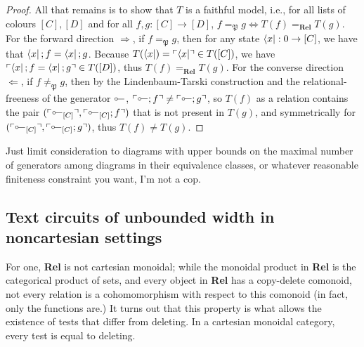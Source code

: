 \begin{theorem}
\begin{proof}
All that remains is to show that $T$ is a faithful model, i.e., for all lists of colours $[C],[D]$ and for all $f,g : [C] \rightarrow [D]$, $f =_\mathfrak{P} g \iff T(f) =_\textbf{Rel} T(g)$. For the forward direction $\Rightarrow$, if $f =_\mathfrak{P} g$, then for any state $\bra{x} : 0 \rightarrow [C]$, we have that $\bra{x};f = \bra{x};g$. Because $T(\bra{x}) = \ulcorner \bra{x} \urcorner \in T([C])$, we have $\ulcorner \bra{x};f = \bra{x};g \urcorner \in T([D])$, thus $T(f) =_\textbf{Rel} T(g)$. For the converse direction $\Leftarrow$, if $f \neq_\mathfrak{P} g$, then by the Lindenbaum-Tarski construction and the relational-freeness of the generator $\rotatebox[origin=c]{180}{$\multimap$}$, $\ulcorner \rotatebox[origin=c]{180}{$\multimap$};f \urcorner \neq \ulcorner \rotatebox[origin=c]{180}{$\multimap$};g \urcorner$, so $T(f)$ as a relation contains the pair $(\ulcorner \rotatebox[origin=c]{180}{$\multimap$}_{[C]} \urcorner, \ulcorner \rotatebox[origin=c]{180}{$\multimap$}_{[C]};f \urcorner)$ that is not present in $T(g)$, and symmetrically for $(\ulcorner \rotatebox[origin=c]{180}{$\multimap$}_{[C]} \urcorner, \ulcorner \rotatebox[origin=c]{180}{$\multimap$}_{[C]};g \urcorner)$, thus $T(f) \neq T(g)$.
\end{proof}
\end{theorem}

\begin{corollary}
Just limit consideration to diagrams with upper bounds on the maximal number of generators among diagrams in their equivalence classes, or whatever reasonable finiteness constraint you want, I'm not a cop.
\end{corollary}

\subsection{Text circuits of unbounded width in noncartesian settings}

 For one, \textbf{Rel} is not cartesian monoidal; while the monoidal product in \textbf{Rel} is the categorical product of sets, and every object in \textbf{Rel} has a copy-delete comonoid, not every relation is a cohomomorphism with respect to this comonoid (in fact, only the functions are.) It turns out that this property is what allows the existence of tests that differ from deleting. In a cartesian monoidal category, every test is equal to deleting.

